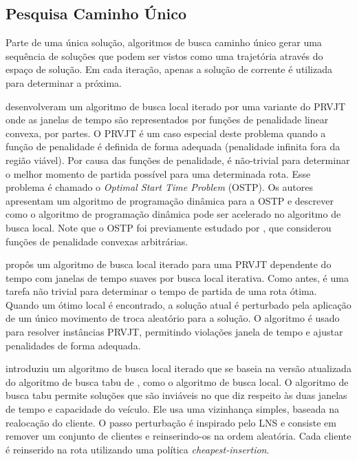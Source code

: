 \subsection{Pesquisa Caminho Único} 

Parte de uma única solução, algoritmos de busca caminho único gerar uma sequência de soluções que podem ser vistos como uma trajetória através do espaço de solução. Em cada iteração, apenas a solução de corrente é utilizada para determinar a próxima.
 
\cite{hashimoto06} desenvolveram um algoritmo de busca local iterado por uma variante do PRVJT onde as janelas de tempo são representados por funções de penalidade linear convexa, por partes. O PRVJT é um caso especial deste problema quando a função de penalidade é definida de forma adequada (penalidade infinita fora da região viável). Por causa das funções de penalidade, é não-trivial para determinar o melhor momento de partida possível para uma determinada rota. Esse problema é chamado o \textit{Optimal Start Time Problem} (OSTP). Os autores apresentam um algoritmo de programação dinâmica para a OSTP e descrever como o algoritmo de programação dinâmica pode ser acelerado no algoritmo de busca local. Note que o OSTP foi previamente estudado por \cite{desrosiers86}, que considerou funções de penalidade convexas arbitrárias.


 
\cite{hashimoto06} propôs um algoritmo de busca local iterado para uma PRVJT dependente do tempo com janelas de tempo suaves por busca local iterativa. Como antes, é uma tarefa não trivial para determinar o tempo de partida de uma rota ótima. Quando um ótimo local é encontrado, a solução atual é perturbado pela aplicação de um único movimento de troca aleatório para a solução. O algoritmo é usado para resolver instâncias PRVJT, permitindo violações janela de tempo e ajustar penalidades de forma adequada.
 
 
\cite{cordeau2011} introduziu um algoritmo de busca local iterado que se baseia na versão atualizada do algoritmo de busca tabu de \cite{cordeau04}, como o algoritmo de busca local. O algoritmo de busca tabu permite soluções que são inviáveis no que diz respeito às duas janelas de tempo e capacidade do veículo. Ele usa uma vizinhança simples, baseada na realocação do cliente. O passo perturbação é inspirado pelo LNS e consiste em remover um conjunto de clientes e reinserindo-os na ordem aleatória. Cada cliente é reinserido na rota utilizando uma política \textit{cheapest-insertion}.

